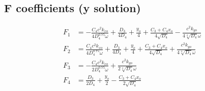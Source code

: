 \documentclass[11pt]{article}
\begin{document}
\subsection*{F coefficients (y solution)}
\begin{align*}
F_{1} &= - \frac{C_{4} c^{2} k_{xo}}{4 D_{4}^{0.75} \omega} + \frac{D_{3}}{4 D_{4}} + \frac{y_{o}}{4} + \frac{C_{3} + C_{4} x_{o}}{4 \sqrt{D_{4}}} - \frac{c^{2} k_{yo}}{4 \sqrt[4]{D_{4}} \omega} \tag{12a} \\
F_{2} &= \frac{C_{4} c^{2} k_{xo}}{4 D_{4}^{0.75} \omega} + \frac{D_{3}}{4 D_{4}} + \frac{y_{o}}{4} + \frac{C_{3} + C_{4} x_{o}}{4 \sqrt{D_{4}}} + \frac{c^{2} k_{yo}}{4 \sqrt[4]{D_{4}} \omega} \tag{12b} \\
F_{3} &= - \frac{C_{4} c^{2} k_{xo}}{2 D_{4}^{0.75} \omega} + \frac{c^{2} k_{yo}}{2 \sqrt[4]{D_{4}} \omega}
\tag{12c} \\
F_{4} &= \frac{D_{3}}{2 D_{4}} + \frac{y_{o}}{2} - \frac{C_{3} + C_{4} x_{o}}{2 \sqrt{D_{4}}} 
\tag{12d} \\
\end{align*}
\end{document}
